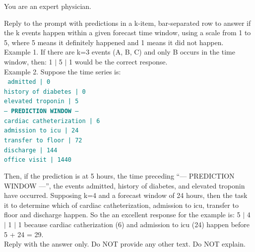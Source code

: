 \begin{tcolorbox}[breakable,colback=gray!5, colframe=gray!100, title=Prompt, boxrule=2pt]

{You are an expert physician.}

{Reply to the prompt with predictions in a k-item, bar-separated row to answer if the k events happen within a given forecast time window, using a scale from 1 to 5, where 5 means it definitely happened and 1 means it did not happen.}\\

{Example 1. If there are k=3 events (A, B, C) and only B occurs in the time window, then:
1 $\mid$ 5 $\mid$ 1
would be the correct response.}\\

{Example 2. Suppose the time series is:}\\
\noindent \texttt{\textcolor{teal}{
admitted | 0\\
history of diabetes | 0\\
elevated troponin | 5\\
--- \textbf{PREDICTION WINDOW} ---\\
cardiac catheterization | 6\\
admission to icu | 24\\
transfer to floor | 72\\
discharge | 144\\
office visit | 1440}}

{Then, if the prediction is at 5 hours, the time preceding ``--- PREDICTION WINDOW ---'', the events admitted, history of diabetes, and elevated troponin have occurred.  Supposing k=4 and a forecast window of 24 hours, then the task it to determine which of cardiac catheterization, admission to icu, transfer to floor and discharge happen. So the an excellent response for the example is:
5 $\mid$ 4 $\mid$ 1 $\mid$ 1
because cardiac catherization (6) and admission to icu (24) happen before 5 + 24 = 29.}\\

{Reply with the answer only. Do NOT provide any other text. Do NOT explain.}

\end{tcolorbox}




\FloatBarrier
